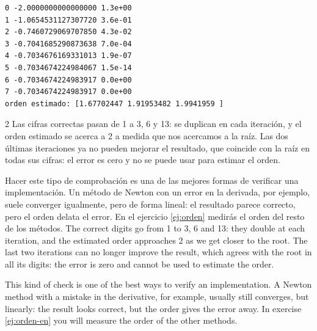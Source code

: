 \begin{verbatim}
0 -2.0000000000000000 1.3e+00
1 -1.0654531127307720 3.6e-01
2 -0.7460729069707850 4.3e-02
3 -0.7041685290873638 7.0e-04
4 -0.7034676169331013 1.9e-07
5 -0.7034674224984067 1.5e-14
6 -0.7034674224983917 0.0e+00
7 -0.7034674224983917 0.0e+00
orden estimado: [1.67702447 1.91953482 1.9941959 ]
\end{verbatim}
\begin{paracol}{2}
Las cifras correctas pasan de 1 a 3, 6 y 13: se duplican en cada iteración, y el orden estimado se acerca a 2 a medida que nos acercamos a la raíz. Las dos últimas iteraciones ya no pueden mejorar el resultado, que coincide con la raíz en todas sus cifras: el error es cero y no se puede usar para estimar el orden.

Hacer este tipo de comprobación es una de las mejores formas de verificar una implementación. Un método de Newton con un error en la derivada, por ejemplo, suele converger igualmente, pero de forma lineal: el resultado parece correcto, pero el orden delata el error. En el ejercicio \ref{ej:orden} medirás el orden del resto de los métodos.
\switchcolumn
The correct digits go from 1 to 3, 6 and 13: they double at each iteration, and the estimated order approaches 2 as we get closer to the root. The last two iterations can no longer improve the result, which agrees with the root in all its digits: the error is zero and cannot be used to estimate the order.

This kind of check is one of the best ways to verify an implementation. A Newton method with a mistake in the derivative, for example, usually still converges, but linearly: the result looks correct, but the order gives the error away. In exercise \ref{ej:orden-en} you will measure the order of the other methods.
\end{paracol}

